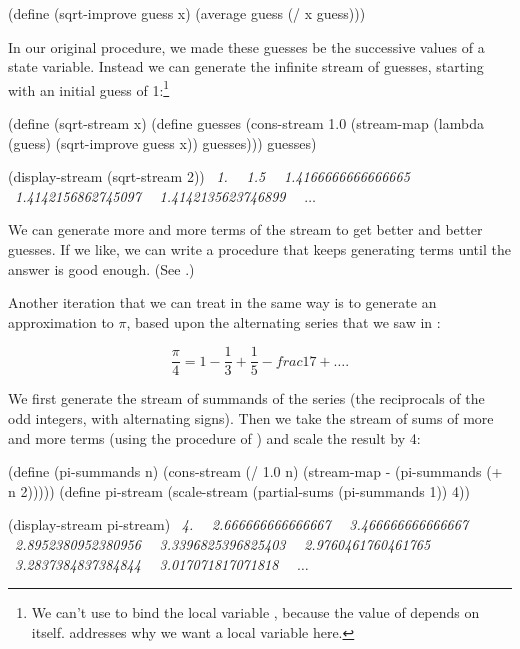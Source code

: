 \begin{codeBlock}
(define (sqrt-improve guess x)
  (average guess (/ x guess)))
\end{codeBlock}

\noindent
In our original  procedure, we made these guesses be the successive
values of a state variable. Instead we can generate the infinite stream of
guesses, starting with an initial guess of 1:\footnote{We can't use 
to bind the local variable , because the value of 
depends on  itself.   addresses why we want a
local variable here.}

\begin{codeBlock}
(define (sqrt-stream x)
  (define guesses
    (cons-stream
      1.0
      (stream-map (lambda (guess)
                    (sqrt-improve guess x))
                  guesses)))
  guesses)

(display-stream (sqrt-stream 2))
~\textit{1.}~
~\textit{1.5}~
~\textit{1.4166666666666665}~
~\textit{1.4142156862745097}~
~\textit{1.4142135623746899}~
~\( \dots \)~
\end{codeBlock}

\noindent
We can generate more and more terms of the stream to get better and better
guesses.  If we like, we can write a procedure that keeps generating terms
until the answer is good enough.  (See .)

Another iteration that we can treat in the same way is to generate an
approximation to \( \pi \), based upon the alternating series that we saw in
:

$$ \frac{\pi}{4} = 1 - \frac{1}{3} + \frac{1}{5} - frac{1}{7} + \dots. $$

We first generate the stream of summands of the series (the reciprocals of the
odd integers, with alternating signs).  Then we take the stream of sums of more
and more terms (using the  procedure of
) and scale the result by 4:

\begin{codeBlock}
(define (pi-summands n)
  (cons-stream (/ 1.0 n)
               (stream-map - (pi-summands (+ n 2)))))
(define pi-stream
  (scale-stream (partial-sums (pi-summands 1)) 4))

(display-stream pi-stream)
~\textit{4.}~
~\textit{2.666666666666667}~
~\textit{3.466666666666667}~
~\textit{2.8952380952380956}~
~\textit{3.3396825396825403}~
~\textit{2.9760461760461765}~
~\textit{3.2837384837384844}~
~\textit{3.017071817071818}~
~\( \dots \)~
\end{codeBlock}

